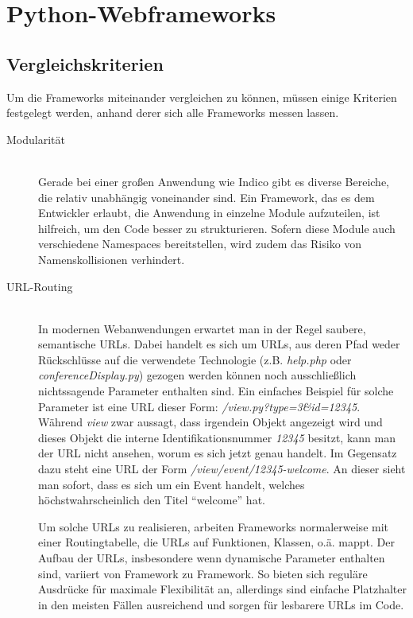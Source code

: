 \chapter{Python-Webframeworks}

\section{Vergleichskriterien}
Um die Frameworks miteinander vergleichen zu können, müssen einige Kriterien festgelegt werden,
anhand derer sich alle Frameworks messen lassen.

\begin{description}
\item[Modularität] \hfill \\
Gerade bei einer großen Anwendung wie Indico gibt es diverse Bereiche, die relativ unabhängig
voneinander sind. Ein Framework, das es dem Entwickler erlaubt, die Anwendung in einzelne Module
aufzuteilen, ist hilfreich, um den Code besser zu strukturieren. Sofern diese Module auch
verschiedene Namespaces bereitstellen, wird zudem das Risiko von Namenskollisionen verhindert.

\item[URL-Routing] \hfill \\
In modernen Webanwendungen erwartet man in der Regel saubere, semantische URLs. Dabei handelt es
sich um URLs, aus deren Pfad weder Rückschlüsse auf die verwendete Technologie (z.B. \emph{help.php}
oder \emph{conferenceDisplay.py}) gezogen werden können noch ausschließlich nichtssagende Parameter
enthalten sind. Ein einfaches Beispiel für solche Parameter ist eine URL dieser Form:
\emph{/view.py?type=3\&id=12345}. Während \emph{view} zwar aussagt, dass irgendein Objekt angezeigt
wird und dieses Objekt die interne Identifikationsnummer \emph{12345} besitzt, kann man der URL
nicht ansehen, worum es sich jetzt genau handelt. Im Gegensatz dazu steht eine URL der Form
\emph{/view/event/12345-welcome}. An dieser sieht man sofort, dass es sich um ein Event handelt,
welches höchstwahrscheinlich den Titel \enquote{welcome} hat.

Um solche URLs zu realisieren, arbeiten Frameworks normalerweise mit einer Routingtabelle, die URLs
auf Funktionen, Klassen, o.ä. mappt. Der Aufbau der URLs, insbesondere wenn dynamische Parameter
enthalten sind, variiert von Framework zu Framework. So bieten sich reguläre Ausdrücke für maximale
Flexibilität an, allerdings sind einfache Platzhalter in den meisten Fällen ausreichend und sorgen
für lesbarere URLs im Code.


\end{description}
